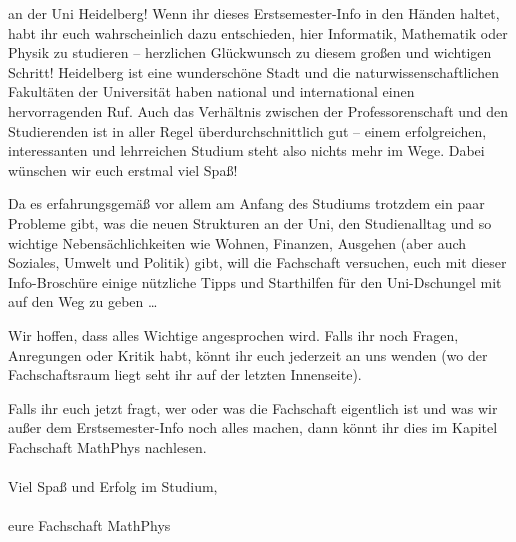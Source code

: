 an der Uni Heidelberg! Wenn ihr dieses Erstsemester-Info in den Händen haltet,
habt ihr euch wahrscheinlich dazu entschieden, hier Informatik, Mathematik
oder Physik zu studieren -- herzlichen Glückwunsch zu diesem großen und
wichtigen Schritt! Heidelberg ist eine wunderschöne Stadt und die
naturwissenschaftlichen Fakultäten der Universität haben national und
international einen hervorragenden Ruf. Auch das Verhältnis zwischen der
Professorenschaft und den Studierenden ist in aller Regel überdurchschnittlich
gut -- einem erfolgreichen, interessanten und lehrreichen Studium steht also
nichts mehr im Wege. Dabei wünschen wir euch erstmal viel Spaß! \smiley

Da es erfahrungsgemäß vor allem am Anfang des Studiums trotzdem ein
paar Probleme gibt, was die neuen Strukturen an der Uni, den
Studienalltag und so wichtige Nebensächlichkeiten wie Wohnen,
Finanzen, Ausgehen (aber auch Soziales, Umwelt und Politik) gibt, will
die Fachschaft versuchen, euch mit dieser Info-Broschüre einige
nützliche Tipps und Starthilfen für den Uni-Dschungel mit auf den Weg
zu geben \dots


Wir hoffen, dass alles Wichtige angesprochen wird. Falls ihr noch
Fragen, Anregungen oder Kritik habt, könnt ihr euch jederzeit an uns
wenden (wo der Fachschaftsraum liegt seht ihr auf der letzten Innenseite).

Falls ihr euch jetzt fragt, wer oder was die Fachschaft eigentlich ist
und was wir außer dem Erstsemester-Info noch alles machen, dann könnt
ihr dies im Kapitel Fachschaft MathPhys nachlesen. \\\\ \noindent Viel Spaß und Erfolg
im Studium,\\\\

eure Fachschaft MathPhys
